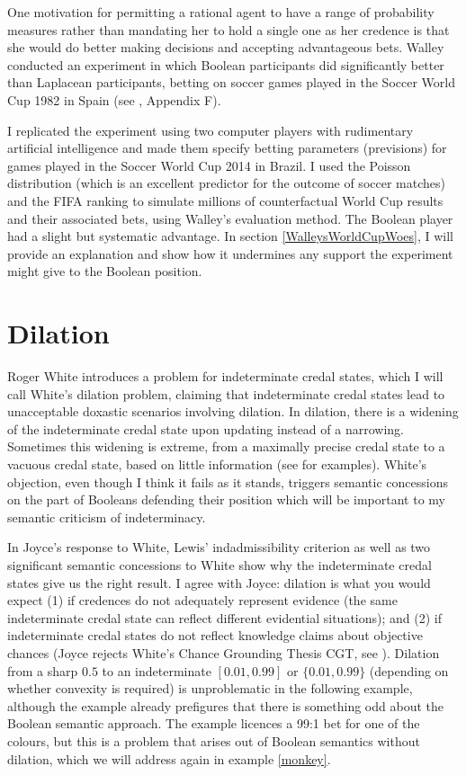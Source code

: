 One motivation for permitting a rational agent to have
a range of probability measures rather than mandating
her to hold a single one as her credence is that she
would do better making decisions and accepting
advantageous bets. Walley conducted an experiment in
which Boolean participants did significantly better
than Laplacean participants, betting on soccer games
played in the Soccer World Cup 1982 in Spain (see
, Appendix F).

I replicated the experiment using two computer players
with rudimentary artificial intelligence and made them
specify betting parameters (previsions) for games
played in the Soccer World Cup 2014 in Brazil. I used
the Poisson distribution (which is an excellent
predictor for the outcome of soccer matches) and the
FIFA ranking to simulate millions of counterfactual
World Cup results and their associated bets, using
Walley's evaluation method. The Boolean player had a
slight but systematic advantage. In section
\ref{WalleysWorldCupWoes}, I will provide an
explanation and show how it undermines any support the
experiment might give to the Boolean position.

\section{Dilation}
\label{Dilation}

Roger White introduces a problem for indeterminate
credal states, which I will call White's dilation
problem, claiming that indeterminate credal states lead
to unacceptable doxastic scenarios involving dilation.
In dilation, there is a widening of the indeterminate
credal state upon updating instead of a narrowing.
Sometimes this widening is extreme, from a maximally
precise credal state to a vacuous credal state, based
on little information (see  for
examples). White's objection, even though I think it
fails as it stands, triggers semantic concessions on
the part of Booleans defending their position which
will be important to my semantic criticism of
indeterminacy.

In Joyce's response to White, Lewis' indadmissibility
criterion as well as two significant semantic
concessions to White show why the indeterminate credal
states give us the right result. I agree with Joyce:
dilation is what you would expect (1) if credences do
not adequately represent evidence (the same
indeterminate credal state can reflect different
evidential situations); and (2) if indeterminate credal
states do not reflect knowledge claims about objective
chances (Joyce rejects White's Chance Grounding Thesis
CGT, see ). Dilation from a
sharp $0.5$ to an indeterminate $[0.01,0.99]$ or
$\{0.01,0.99\}$ (depending on whether convexity is
required) is unproblematic in the following example,
although the example already prefigures that there is
something odd about the Boolean semantic approach. The
example licences a 99:1 bet for one of the colours, but
this is a problem that arises out of Boolean semantics
without dilation, which we will address again in
example \ref{monkey}.

